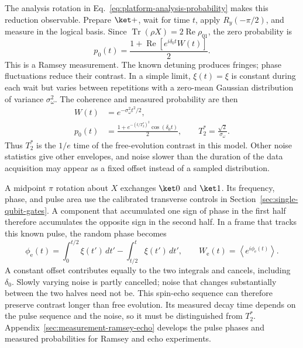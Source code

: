 The analysis rotation in
Eq.~\eqref{eq:platform-analysis-probability} makes this reduction
observable. Prepare $\ket+$, wait for time $t$, apply $R_y(-\pi/2)$,
and measure in the logical basis. Since
$\operatorname{Tr}(\rho X)=2\operatorname{Re}\rho_{01}$, the zero
probability is
\begin{equation}
 p_0(t)=\frac{1+\operatorname{Re}[e^{i\delta_0t}W(t)]}{2}.
 \label{eq:platform-ramsey-coherence}
\end{equation}
This is a Ramsey measurement. The known detuning produces fringes;
phase fluctuations reduce their contrast. In a simple limit,
$\xi(t)=\xi$ is constant during each wait but varies between
repetitions with a zero-mean Gaussian distribution of variance
$\sigma_\omega^2$. The coherence and measured probability are then
\begin{equation}
 \begin{aligned}
 W(t)&=e^{-\sigma_\omega^2t^2/2},\\
 p_0(t)&=\frac{1+e^{-(t/T_2^*)^2}\cos(\delta_0t)}2,
 \qquad T_2^*=\frac{\sqrt2}{\sigma_\omega}.
 \end{aligned}
 \label{eq:platform-gaussian-coherence}
\end{equation}
Thus $T_2^*$ is the $1/e$ time of the free-evolution contrast in
this model. Other noise statistics give other envelopes, and noise
slower than the duration of the data acquisition may appear as a
fixed offset instead of a sampled distribution.

A midpoint $\pi$ rotation about $X$ exchanges $\ket0$ and $\ket1$.
Its frequency, phase, and pulse area use the calibrated transverse
controls in Section~\ref{sec:single-qubit-gates}.
A component that accumulated one sign of phase in the first half
therefore accumulates the opposite sign in the second half.
In a frame that tracks this known pulse, the random phase becomes
\begin{equation}
 \phi_{\mathrm e}(t)
   =\int_0^{t/2}\xi(t')\,dt'
       -\int_{t/2}^{t}\xi(t')\,dt',
 \qquad W_{\mathrm e}(t)=\left\langle e^{i\phi_{\mathrm e}(t)}\right\rangle.
 \label{eq:platform-echo-coherence}
\end{equation}
A constant offset contributes equally to the two integrals and
cancels, including $\delta_0$. Slowly varying noise is partly
cancelled; noise that changes substantially between the two halves
need not be. This spin-echo sequence can therefore preserve contrast
longer than free evolution. Its measured decay time depends on the
pulse sequence and the noise, so it must be distinguished from
$T_2^*$. Appendix~\ref{sec:measurement-ramsey-echo} develops the pulse
phases and measured probabilities for Ramsey and echo experiments.

